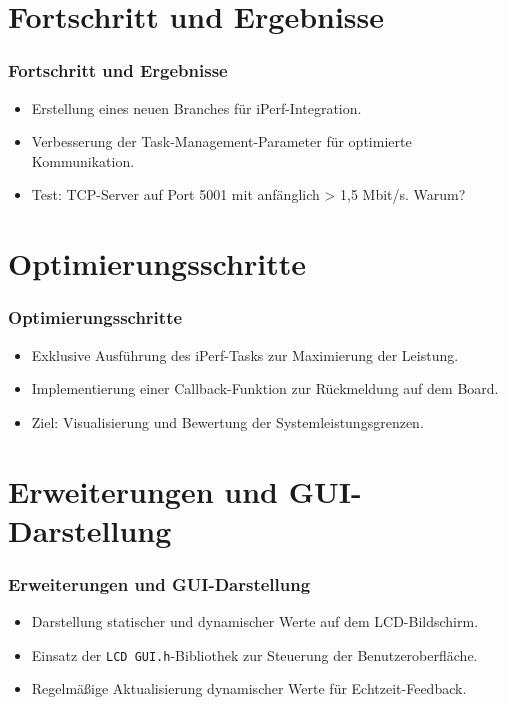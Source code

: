 \documentclass{beamer}
\begin{document}
\section{Fortschritt und Ergebnisse}
\begin{frame}
    \frametitle{Fortschritt und Ergebnisse}
    \begin{itemize}
        \item Erstellung eines neuen Branches für iPerf-Integration.
        \item Verbesserung der Task-Management-Parameter für optimierte Kommunikation.
        \item Test: TCP-Server auf Port 5001 mit anfänglich > 1,5 Mbit/s. Warum?
    \end{itemize}
\end{frame}

\section{Optimierungsschritte}
\begin{frame}
    \frametitle{Optimierungsschritte}
    \begin{itemize}
        \item Exklusive Ausführung des iPerf-Tasks zur Maximierung der Leistung.
        \item Implementierung einer Callback-Funktion zur Rückmeldung auf dem Board.
        \item Ziel: Visualisierung und Bewertung der Systemleistungsgrenzen.
    \end{itemize}
\end{frame}

\section{Erweiterungen und GUI-Darstellung}
\begin{frame}
    \frametitle{Erweiterungen und GUI-Darstellung}
    \begin{itemize}
        \item Darstellung statischer und dynamischer Werte auf dem LCD-Bildschirm.
        \item Einsatz der \texttt{LCD GUI.h}-Bibliothek zur Steuerung der Benutzeroberfläche.
        \item Regelmäßige Aktualisierung dynamischer Werte für Echtzeit-Feedback.
    \end{itemize}
\end{frame}
\end{document}
